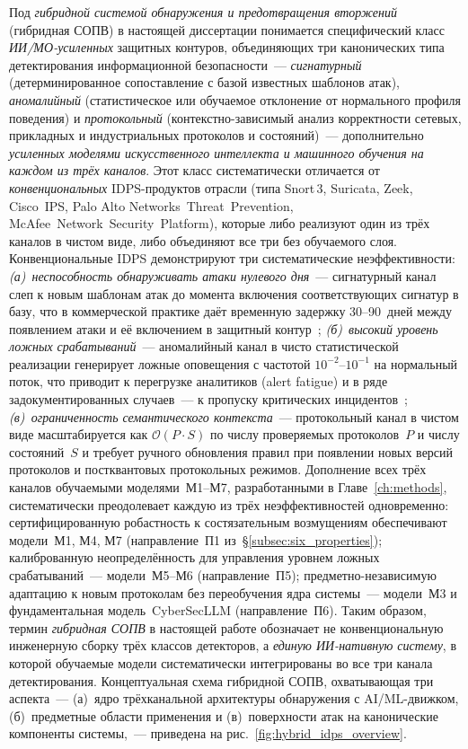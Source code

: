 Под \emph{гибридной системой обнаружения и предотвращения вторжений}
(гибридная СОПВ) в настоящей диссертации понимается специфический класс
\emph{ИИ/МО-усиленных} защитных контуров, объединяющих три
канонических типа детектирования информационной безопасности~---
\emph{сигнатурный} (детерминированное сопоставление с базой
известных шаблонов атак), \emph{аномалийный} (статистическое или
обучаемое отклонение от нормального профиля поведения) и
\emph{протокольный} (контекстно-зависимый анализ корректности
сетевых, прикладных и индустриальных протоколов и состояний)~---
дополнительно \emph{усиленных моделями искусственного интеллекта и
машинного обучения на каждом из трёх каналов}. Этот класс
систематически отличается от \emph{конвенциональных} IDPS-продуктов
отрасли (типа \mbox{Snort\,3}, Suricata, Zeek, Cisco~IPS, Palo Alto
Networks~Threat~Prevention, McAfee~Network~Security~Platform),
которые либо реализуют один из трёх каналов в чистом виде, либо
объединяют все три без обучаемого слоя. Конвенциональные IDPS
демонстрируют три систематические неэффективности:
\emph{(а)~неспособность обнаруживать атаки нулевого
дня}~--- сигнатурный канал слеп к новым шаблонам атак до момента
включения соответствующих сигнатур в базу, что в коммерческой
практике даёт временную задержку 30--90~дней между появлением атаки
и её включением в защитный контур~\cite{Sachkov2022threat};
\emph{(б)~высокий уровень ложных срабатываний}~--- аномалийный канал в
чисто статистической реализации генерирует ложные оповещения с
частотой $10^{-2}$--$10^{-1}$ на нормальный поток, что приводит к
перегрузке аналитиков (alert fatigue) и в ряде задокументированных
случаев~--- к пропуску критических
инцидентов~\cite{FerragPoisoning2023}; \emph{(в)~ограниченность
семантического контекста}~--- протокольный канал в чистом виде
масштабируется как $\mathcal{O}(P\cdot S)$ по числу проверяемых
протоколов~$P$ и числу состояний~$S$ и требует ручного обновления
правил при появлении новых версий протоколов и постквантовых
протокольных режимов. Дополнение всех трёх каналов обучаемыми
моделями~М1--М7, разработанными в Главе~\ref{ch:methods},
систематически преодолевает каждую из трёх неэффективностей
одновременно: сертифицированную робастность к состязательным
возмущениям обеспечивают модели~М1, М4, М7 (направление~П1
из~\S\ref{subsec:six_properties}); калиброванную неопределённость для
управления уровнем ложных срабатываний~--- модели~М5--М6 (направление~П5);
предметно-независимую адаптацию к новым протоколам без переобучения
ядра системы~--- модели~М3 и фундаментальная модель~CyberSecLLM
(направление~П6). Таким образом, термин \emph{гибридная СОПВ} в
настоящей работе обозначает не конвенциональную инженерную сборку
трёх классов детекторов, а \emph{единую ИИ-нативную систему}, в
которой обучаемые модели систематически интегрированы во все три
канала детектирования. Концептуальная схема гибридной СОПВ,
охватывающая три аспекта~--- (а)~ядро трёхканальной архитектуры
обнаружения с AI/ML-движком, (б)~предметные области применения и
(в)~поверхности атак на канонические компоненты системы,~---
приведена на рис.~\ref{fig:hybrid_idps_overview}.

